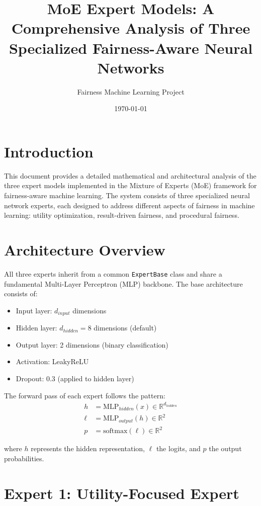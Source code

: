 \documentclass[11pt]{article}
\title{MoE Expert Models: A Comprehensive Analysis of Three Specialized Fairness-Aware Neural Networks}
\author{Fairness Machine Learning Project}
\date{\today}
\begin{document}
\maketitle

\section{Introduction}

This document provides a detailed mathematical and architectural analysis of the three expert models implemented in the Mixture of Experts (MoE) framework for fairness-aware machine learning. The system consists of three specialized neural network experts, each designed to address different aspects of fairness in machine learning: utility optimization, result-driven fairness, and procedural fairness.

\section{Architecture Overview}

All three experts inherit from a common \texttt{ExpertBase} class and share a fundamental Multi-Layer Perceptron (MLP) backbone. The base architecture consists of:

\begin{itemize}
    \item Input layer: $d_{input}$ dimensions
    \item Hidden layer: $d_{hidden} = 8$ dimensions (default)
    \item Output layer: 2 dimensions (binary classification)
    \item Activation: LeakyReLU
    \item Dropout: 0.3 (applied to hidden layer)
\end{itemize}

The forward pass of each expert follows the pattern:
\begin{align}
    h &= \text{MLP}_{hidden}(x) \in \mathbb{R}^{d_{hidden}} \\
    \ell &= \text{MLP}_{output}(h) \in \mathbb{R}^{2} \\
    p &= \text{softmax}(\ell) \in \mathbb{R}^{2}
\end{align}

where $h$ represents the hidden representation, $\ell$ the logits, and $p$ the output probabilities.

\section{Expert 1: Utility-Focused Expert}
\end{document}
